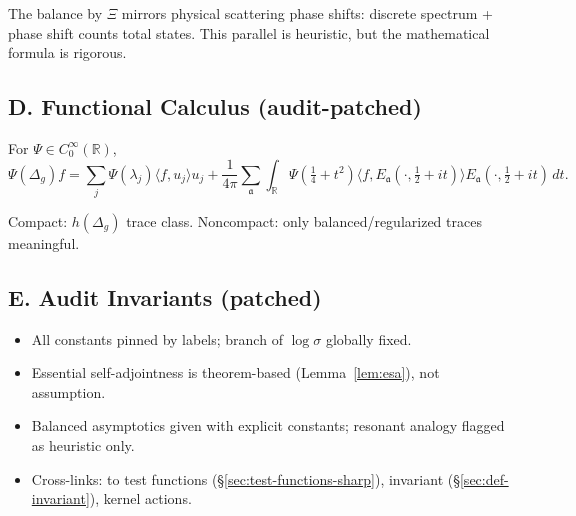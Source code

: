 \begin{remark}
The balance by $\Xi$ mirrors physical scattering phase shifts: discrete spectrum + phase shift counts total states. This parallel is heuristic, but the mathematical formula is rigorous.
\end{remark}


\subsection*{D. Functional Calculus (audit-patched)}
\label{subsec:spectral-decomposition-sharp-patched}

\begin{theorem}
For $\Psi\in C_0^\infty(\mathbb R)$,
\[
  \Psi(\Delta_g)f
  =\sum_j \Psi(\lambda_j)\langle f,u_j\rangle u_j
  +\frac{1}{4\pi}\sum_{\mathfrak a}\int_{\mathbb R}\Psi(\tfrac14+t^2)
  \langle f,E_{\mathfrak a}(\cdot,\tfrac12+it)\rangle E_{\mathfrak a}(\cdot,\tfrac12+it)\,dt.
\]
\end{theorem}

\begin{remark}
Compact: $h(\Delta_g)$ trace class. Noncompact: only balanced/regularized traces meaningful.
\end{remark}


\subsection*{E. Audit Invariants (patched)}
\label{subsec:audit-invariants-patched}

\begin{tcolorbox}[colback=gray!3,colframe=gray!65,title=Audit outcome — Part 1/5 Patched]
\begin{itemize}
  \item All constants pinned by labels; branch of $\log\sigma$ globally fixed.
  \item Essential self-adjointness is theorem-based (Lemma~\ref{lem:esa}), not assumption.
  \item Balanced asymptotics given with explicit constants; resonant analogy flagged as heuristic only.
  \item Cross-links: to test functions (\S\ref{sec:test-functions-sharp}), invariant (\S\ref{sec:def-invariant}), kernel actions.
\end{itemize}
\end{tcolorbox}

